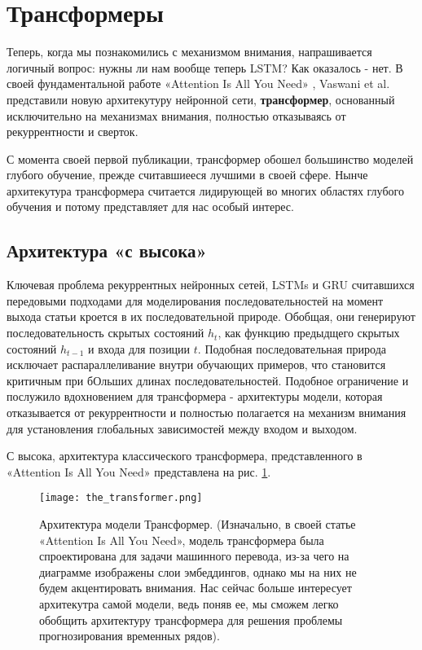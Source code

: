 \section{Трансформеры}

Теперь, когда мы познакомились с механизмом внимания, напрашивается логичный вопрос: 
нужны ли нам вообще теперь LSTM? Как оказалось - нет. В своей фундаментальной работе 
«Attention Is All You Need» \cite{vaswani2017attention}, Vaswani et al. представили 
новую архитекутуру нейронной сети, \textbf{трансформер}, основанный исключительно на 
механизмах внимания, полностью отказываясь от рекуррентности и сверток. 

С момента своей первой публикации, трансформер обошел большинство моделей 
глубого обучение, прежде считавшиееся лучшими в своей сфере. Нынче архитекутура 
трансформера считается лидирующей во многих областях глубого обучения и потому 
представляет для нас особый интерес.


\subsection{Архитектура «с высока»}

Ключевая проблема рекуррентных нейронных сетей, LSTMs и GRU считавшихся передовыми 
подходами для моделирования последовательностей на момент выхода статьи \cite{vaswani2017attention} 
кроется в их последовательной природе. Обобщая, они генерируют последовательность скрытых 
состояний $h_t$, как функцию предыдщего скрытых состояний $h_{t-1}$ и входа для позиции 
$t$. Подобная последовательная природа исключает распараллеливание внутри обучающих 
примеров, что становится критичным при бОльших длинах последовательностей. Подобное 
ограничение и послужило вдохновением для трансформера - архитектуры модели, 
которая отказывается от рекуррентности и полностью полагается на механизм 
внимания для установления глобальных зависимостей между входом и выходом.

С высока, архитектура классического трансформера, представленного в 
«Attention Is All You Need» \cite{vaswani2017attention} представлена 
на рис. \ref{fig:the_transformer}. 

\begin{figure}[h!]
    \centering
    \texttt{[image: the\_transformer.png]}
    \caption{Архитектура модели Трансформер. (Изначально, в своей статье 
    «Attention Is All You Need», модель трансформера была спроектирована для 
    задачи машинного перевода, из-за чего на диаграмме изображены слои эмбеддингов, 
    однако мы на них не будем акцентировать внимания. Нас сейчас больше интересует 
    архитекутра самой модели, ведь поняв ее, мы сможем легко обобщить 
    архитектуру трансформера для решения проблемы прогнозирования временных 
    рядов).}
    \label{fig:the_transformer}
\end{figure}

